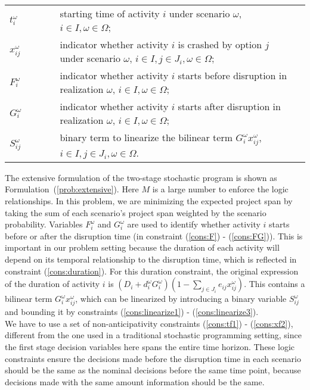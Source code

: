 \documentclass[11pt]{article}
\newcommand{\noi}{\noindent}
\begin{document}
\begin{table}[H]
\begin{tabular}{ l l l l }
			\(t_{i}^\omega\) & \(\qquad\) & starting time of activity \(i\) under scenario \(\omega\), \(i \in I, \omega \in \Omega\);&\\
			\(x_{ij}^\omega\) & \(\qquad\) & indicator whether activity \(i\) is crashed by option \(j\) under scenario \(\omega\), \(i \in I, j \in J_i, \omega \in \Omega \); &\\
			\(F_i^\omega\) & \(\qquad\) & indicator whether activity \(i\) starts before disruption in realization \(\omega\), \(i \in I, \omega \in \Omega\);&\\
			\(G_i^\omega\) & \(\qquad\) & indicator whether activity \(i\) starts after disruption in realization \(\omega\), \(i \in I, \omega \in \Omega\);&\\
			\(S_{ij}^\omega\) & \(\qquad\) & binary term to linearize the bilinear term \(G_i^\omega x_{ij}^\omega\), \(i \in I, j \in J_{i}, \omega \in \Omega\).&\\
		\end{tabular}
	\end{table}
	\noi The extensive formulation of the two-stage stochastic program is shown as Formulation~(\ref{prob:extensive}). Here \(M\) is a large number to enforce the logic relationships. In this problem, we are minimizing the expected project span by taking the sum of each scenario's project span weighted by the scenario probability. Variables \(F^\omega_i\) and \(G^\omega_i\) are used to identify whether activity \(i\) starts before or after the disruption time (in constraint (\ref{cons:F}) - (\ref{cons:FG})). This is important in our problem setting because the duration of each activity will depend on its temporal relationship to the disruption time, which is reflected in constraint (\ref{cons:duration}). For this duration constraint, the original expression of the duration of activity \(i\) is \((D_i + d_i^\omega G_i^\omega)(1 - \sum_{j \in J_i} e_{ij}x_{ij}^\omega)\). This contains a bilinear term \(G_i^\omega x_{ij}^\omega\), which can be linearized by introducing a binary variable \(S_{ij}^\omega\) and bounding it by constraints (\ref{cons:linearize1}) - (\ref{cons:linearize3}).\\
	\newline
	We have to use a set of non-anticipativity constraints (\ref{cons:tf1}) - (\ref{cons:xf2}), different from the one used in a traditional stochastic programming setting, since the first stage decision variables here spans the entire time horizon. These logic constraints ensure the decisions made before the disruption time in each scenario should be the same as the nominal decisions before the same time point, because decisions made with the same amount information should be the same.\\
\end{document}
